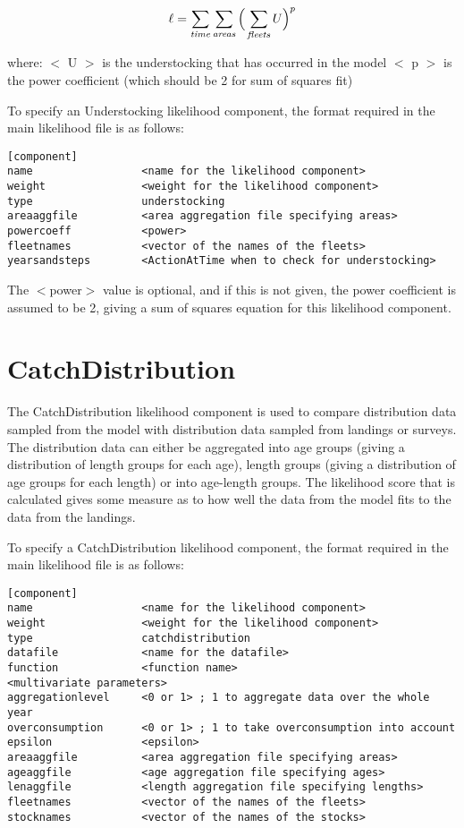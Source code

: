 \documentclass [a4paper, 10pt]{book}
\begin{document}
\begin{equation}\label{eq:understocking}
\ell = \sum_{\it time}\sum_{\it areas} \Big(\sum_{\it fleets} U \Big)^p
\end{equation}

where:\newline
$<$ U $>$ is the understocking that has occurred in the model\newline
$<$ p $>$ is the power coefficient (which should be 2 for sum of squares fit)

\bigskip
To specify an Understocking likelihood component, the format required in the main likelihood file is as follows:

{\small\begin{verbatim}
[component]
name                 <name for the likelihood component>
weight               <weight for the likelihood component>
type                 understocking
areaaggfile          <area aggregation file specifying areas>
powercoeff           <power>
fleetnames           <vector of the names of the fleets>
yearsandsteps        <ActionAtTime when to check for understocking>
\end{verbatim}}

The $<$power$>$ value is optional, and if this is not given, the power coefficient is assumed to be 2, giving a sum of squares equation for this likelihood component.

\newpage %
\section{CatchDistribution}\label{sec:catchdist}
The CatchDistribution likelihood component is used to compare distribution data sampled from the model with distribution data sampled from landings or surveys.  The distribution data can either be aggregated into age groups (giving a distribution of length groups for each age), length groups (giving a distribution of age groups for each length) or into age-length groups.  The likelihood score that is calculated gives some measure as to how well the data from the model fits to the data from the landings.

\bigskip
To specify a CatchDistribution likelihood component, the format required in the main likelihood file is as follows:

{\small\begin{verbatim}
[component]
name                 <name for the likelihood component>
weight               <weight for the likelihood component>
type                 catchdistribution
datafile             <name for the datafile>
function             <function name>
<multivariate parameters>
aggregationlevel     <0 or 1> ; 1 to aggregate data over the whole year
overconsumption      <0 or 1> ; 1 to take overconsumption into account
epsilon              <epsilon>
areaaggfile          <area aggregation file specifying areas>
ageaggfile           <age aggregation file specifying ages>
lenaggfile           <length aggregation file specifying lengths>
fleetnames           <vector of the names of the fleets>
stocknames           <vector of the names of the stocks>
\end{verbatim}}
\end{document}
